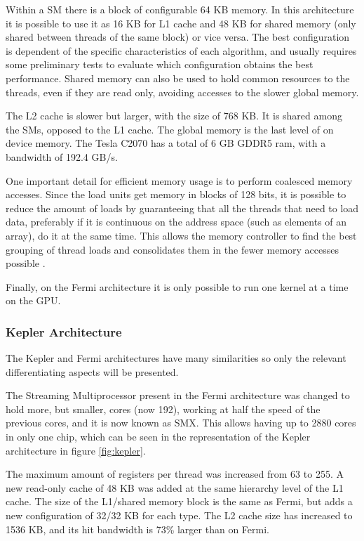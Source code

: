 Within a SM there is a block of configurable 64 KB memory. In this architecture it is possible to use it as 16 KB for L1 cache and 48 KB for shared memory (only shared between threads of the same block) or vice versa. The best configuration is dependent of the specific characteristics of each algorithm, and usually requires some preliminary tests to evaluate which configuration obtains the best performance. Shared memory can also be used to hold common resources to the threads, even if they are read only, avoiding accesses to the slower global memory.

The L2 cache is slower but larger, with the size of 768 KB. It is shared among the SMs, opposed to the L1 cache. The global memory is the last level of on device memory. The Tesla C2070 has a total of 6 GB GDDR5 ram, with a bandwidth of 192.4 GB/s.

One important detail for efficient memory usage is to perform coalesced memory accesses. Since the load units get memory in blocks of 128 bits, it is possible to reduce the amount of loads by guaranteeing that all the threads that need to load data, preferably if it is continuous on the address space (such as elements of an array), do it at the same time. This allows the memory controller to find the best grouping of thread loads and consolidates them in the fewer memory accesses possible \cite{NVIDIA:Fermi}.

Finally, on the Fermi architecture it is only possible to run one kernel at a time on the GPU.

\subsubsection{\nvidia Kepler Architecture}

The Kepler and Fermi architectures have many similarities so only the relevant differentiating aspects will be presented.

The Streaming Multiprocessor present in the Fermi architecture was changed to hold more, but smaller, \cuda cores (now 192), working at half the speed of the previous \cuda cores, and it is now known as SMX. This allows having up to 2880 \cuda cores in only one chip, which can be seen in the representation of the Kepler architecture in figure \ref{fig:kepler}.

The maximum amount of registers per \cuda thread was increased from 63 to 255. A new read-only cache of 48 KB was added at the same hierarchy level of the L1 cache. The size of the L1/shared memory block is the same as Fermi, but adds a new configuration of 32/32 KB for each type. The L2 cache size has increased to 1536 KB, and its hit bandwidth is 73\% larger than on Fermi.

